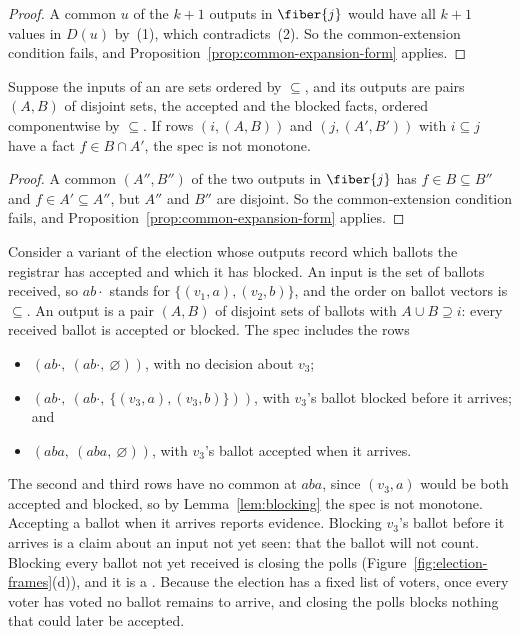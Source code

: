 \begin{proof}
A common \outnoun $u$ of the $k+1$ outputs in $\fiber{j}$ would have all
$k+1$ values in $D(u)$ by~(1), which contradicts~(2).  So the common-extension
condition fails, and Proposition~\ref{prop:common-expansion-form} applies.
\end{proof}

\begin{lemma}
\label{lem:blocking}
Suppose the inputs of an \spectype are sets ordered by $\subseteq$, and its
outputs are pairs $(A,B)$ of disjoint sets, the accepted and the blocked
facts, ordered componentwise by $\subseteq$.  If rows $(i,(A,B))$ and
$(j,(A',B'))$ with $i\subseteq j$ have a fact $f\in B\cap A'$, the spec is not
monotone.
\end{lemma}

\begin{proof}
A common \outnoun $(A'',B'')$ of the two outputs in $\fiber{j}$ has
$f\in B\subseteq B''$ and $f\in A'\subseteq A''$, but $A''$ and $B''$ are
disjoint.  So the common-extension condition fails, and
Proposition~\ref{prop:common-expansion-form} applies.
\end{proof}

Consider a variant of the election whose outputs record which ballots the
registrar has accepted and which it has blocked. An input is the set of ballots
received, so $ab\cdot$ stands for $\{(v_1,a),(v_2,b)\}$, and the order on
ballot vectors is $\subseteq$. An output is a pair $(A,B)$ of disjoint sets of
ballots with $A\cup B\supseteq i$: every received ballot is accepted or
blocked. The spec includes the rows \begin{itemize} \item $(ab\cdot,\
(ab\cdot,\ \varnothing))$, with no decision about $v_3$; \item $(ab\cdot,\
(ab\cdot,\ \{(v_3,a),(v_3,b)\}))$, with $v_3$'s ballot blocked before it
arrives; and \item $(aba,\ (aba,\ \varnothing))$, with $v_3$'s ballot accepted
when it arrives. \end{itemize} The second and third rows have no common
\outnoun at $aba$, since $(v_3,a)$ would be both accepted and blocked, so by
Lemma~\ref{lem:blocking} the spec is not monotone.  Accepting a ballot when it
arrives reports evidence.  Blocking $v_3$'s ballot before it arrives is a claim
about an input not yet seen: that the ballot will not count.  Blocking every
ballot not yet received is closing the polls
(Figure~\ref{fig:election-frames}(d)), and it is a \commitment.  Because the
election has a fixed list of voters, once every voter has voted no ballot
remains to arrive, and closing the polls blocks nothing that could later be
accepted.

